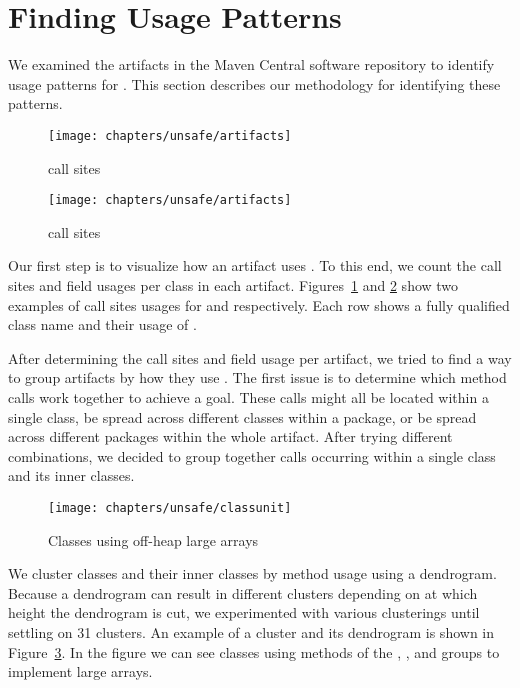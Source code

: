\section{Finding \smu{} Usage Patterns}\label{sec:unsafe:methodology}

We examined the artifacts in the Maven Central software repository to identify usage patterns for \unsafe{}.
This section describes our methodology for identifying these patterns. 

\begin{figure}[!ht]
\texttt{[image: chapters/unsafe/artifacts]}
\caption{ call sites}
\label{fig:appartfingerprint}
\end{figure}

\begin{figure}[!ht]
\texttt{[image: chapters/unsafe/artifacts]}
\caption{ call sites}
\label{fig:langartfingerprint}
\end{figure}

Our first step is to visualize how an artifact uses \unsafe{}.
To this end, we count the \unsafe{} call sites and field usages per class in each artifact.
Figures~\ref{fig:appartfingerprint} and \ref{fig:langartfingerprint} show two examples of call sites usages for  and  respectively.
Each row shows a fully qualified class name and their usage of \smu{}.

After determining the call sites and field usage per artifact, we tried to find a way to group artifacts by how they use \smu{}.
The first issue is to determine which method calls work together to achieve a goal.
These calls might all be located within a single class, be spread across different classes within a package, or be spread across different packages within the whole artifact.
After trying different combinations, we decided to group together calls occurring within a single class and its inner classes.

\begin{figure}[!ht]
\texttt{[image: chapters/unsafe/classunit]}
\caption{Classes using off-heap large arrays}
\label{fig:classunitfingerprint}
\end{figure}

We cluster classes and their inner classes by \unsafe{} method usage using a dendrogram.
Because a dendrogram can result in different clusters depending on at which height the dendrogram is cut,
we experimented with various clusterings until settling on 31 clusters.
An example of a cluster and its dendrogram is shown in Figure~\ref{fig:classunitfingerprint}.
In the figure we can see classes using methods of the , , and  groups to implement large arrays.

